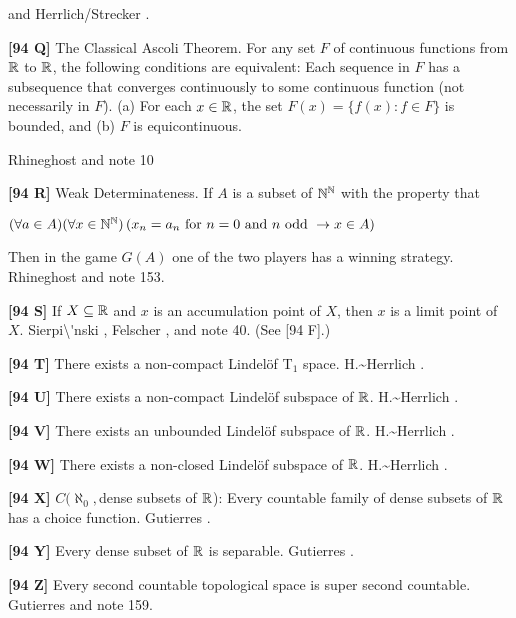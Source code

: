 and \ac{Herrlich/Strecker} \cite{1997}.
\smallskip
\item{}{\bf [94 Q]} The Classical Ascoli Theorem.  For any set $F$ of
continuous functions from $\Bbb R$ to $\Bbb R$, the following
conditions are equivalent:
 Each sequence in $F$ has a subsequence that
converges continuously to some continuous function (not
necessarily in $F$).
 (a) For each $x\in {\Bbb R}$, the set $F(x) = \{
f(x) : f\in F\}$ is bounded, and
\itemitem{} (b) $F$ is equicontinuous.\par
\ac{Rhineghost} \cite{2000} and note 10 
\smallskip
\item{}{\bf[94 R]} Weak Determinateness.  If $A$ is a subset of
${\Bbb N}^{\Bbb N}$ with the property that\newline
\centerline{
$(\forall a\in A)(\forall x\in {\Bbb N}^{\Bbb N})
\left( x_n = a_n\hbox{ for } n=0 \hbox{ and } n \hbox{ odd } \to
x\in A\right)$}
\newline{}
Then in the game $G(A)$ one of the two players has a winning
strategy. \ac{Rhineghost} \cite{2000} and note 153.
\smallskip
\item{}{\bf [94 S]} If $X\subseteq\Bbb R$ and $x$ is an accumulation
point of $X$, then $x$ is a limit point of $X$. \ac{Sierpi\'nski}
\cite{1918}, Felscher \cite{1979}, and note 40. (See [94 F].)
\smallskip
\item{}{\bf [94 T]} There exists a non-compact Lindel\"of T$_1$ space.
\ac{H.~Herrlich} \cite{2001}.
\smallskip
\item{}{\bf [94 U]} There exists a non-compact Lindel\"of subspace of
$\Bbb R$.  \ac{H.~Herrlich} \cite{2001}.
\smallskip
\item{}{\bf [94 V]} There exists an unbounded Lindel\"of subspace of
$\Bbb R$.  \ac{H.~Herrlich} \cite{2001}.
\smallskip
\item{}{\bf [94 W]} There exists a non-closed Lindel\"of subspace of
$\Bbb R$.  \ac{H.~Herrlich} \cite{2001}.
\smallskip
\item{}{\bf [94 X]} $C(\aleph_0,$dense subsets of $\Bbb R$): Every
countable family of dense subsets of $\Bbb R$ has a choice function.
\ac{Gutierres} \cite{2004}.
\smallskip
\item{}{\bf [94 Y]} Every dense subset of $\Bbb R$ is separable.
\ac{Gutierres} \cite{2004}.
\smallskip
\item{}{\bf [94 Z]} Every second countable topological space is
super second countable.  \ac{Gutierres}
\cite{2004} and note 159.
